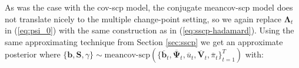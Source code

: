 \documentclass{article}
\begin{document}
As was the case with the cov-scp model, the conjugate meancov-scp model does not translate nicely to the multiple change-point setting, so we again replace $\boldsymbol{\Lambda}_t$ in (\ref{eq:psi_0}) with the same construction as in (\ref{eq:sscp-hadamard}). Using the same approximating technique from Section \ref{sec:sscp} we get an approximate posterior where $\{\mathbf{b}, \mathbf{S}, \gamma\}\sim\text{meancov-scp}(\{\overline{\mathbf{b}}_t, \overline{\boldsymbol{\Psi}}_t, \overline{u}_t, \overline{\mathbf{V}}_t, \overline{\pi}_t\}_{t=1}^T)$ with:
\end{document}
